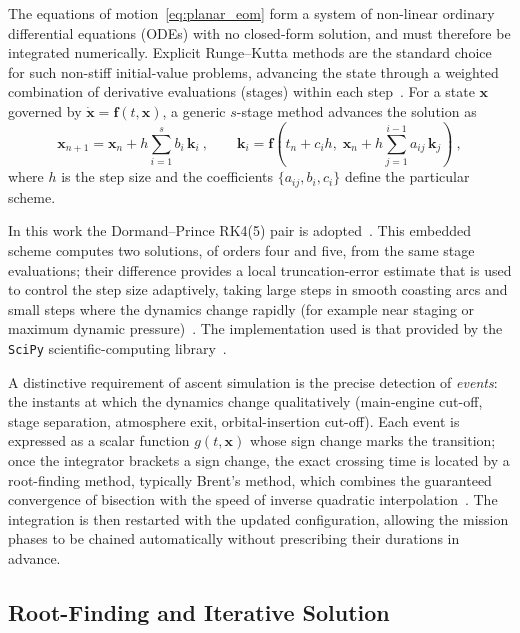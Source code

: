 The equations of motion~\eqref{eq:planar_eom} form a system of non-linear ordinary differential equations (ODEs) with no closed-form solution, and must therefore be integrated numerically. Explicit Runge--Kutta methods are the standard choice for such non-stiff initial-value problems, advancing the state through a weighted combination of derivative evaluations (stages) within each step~\cite{burden2015numerical}. For a state $\mathbf{x}$ governed by $\dot{\mathbf{x}}=\mathbf{f}(t,\mathbf{x})$, a generic $s$-stage method advances the solution as
\begin{equation}
\mathbf{x}_{n+1} = \mathbf{x}_n + h\sum_{i=1}^{s} b_i\,\mathbf{k}_i \ ,
\qquad
\mathbf{k}_i = \mathbf{f}\!\left(t_n+c_i h,\; \mathbf{x}_n + h\sum_{j=1}^{i-1} a_{ij}\,\mathbf{k}_j\right) \ ,
\label{eq:rk_generic}
\end{equation}
where $h$ is the step size and the coefficients $\{a_{ij},b_i,c_i\}$ define the particular scheme.

In this work the Dormand--Prince RK4(5) pair is adopted~\cite{dormand1980family}. This embedded scheme computes two solutions, of orders four and five, from the same stage evaluations; their difference provides a local truncation-error estimate that is used to control the step size adaptively, taking large steps in smooth coasting arcs and small steps where the dynamics change rapidly (for example near staging or maximum dynamic pressure)~\cite{burden2015numerical}. The implementation used is that provided by the \texttt{SciPy} scientific-computing library~\cite{virtanen2020scipy}.

A distinctive requirement of ascent simulation is the precise detection of \emph{events}: the instants at which the dynamics change qualitatively (main-engine cut-off, stage separation, atmosphere exit, orbital-insertion cut-off). Each event is expressed as a scalar function $g(t,\mathbf{x})$ whose sign change marks the transition; once the integrator brackets a sign change, the exact crossing time is located by a root-finding method, typically Brent's method, which combines the guaranteed convergence of bisection with the speed of inverse quadratic interpolation~\cite{brent1973algorithms}. The integration is then restarted with the updated configuration, allowing the mission phases to be chained automatically without prescribing their durations in advance.


\subsection{Root-Finding and Iterative Solution}
\label{ssec:rootfinding}

